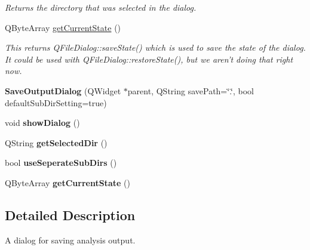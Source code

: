 \begin{DoxyCompactItemize}
\begin{DoxyCompactList}\small\item\em Returns the directory that was selected in the dialog. \end{DoxyCompactList}\item 
\hypertarget{class_save_output_dialog_a8ffa63356170be233940b800b3be8074}{Q\-Byte\-Array \hyperlink{class_save_output_dialog_a8ffa63356170be233940b800b3be8074}{get\-Current\-State} ()}\label{class_save_output_dialog_a8ffa63356170be233940b800b3be8074}

\begin{DoxyCompactList}\small\item\em This returns Q\-File\-Dialog\-::save\-State() which is used to save the state of the dialog. It could be used with Q\-File\-Dialog\-::restore\-State(), but we aren't doing that right now. \end{DoxyCompactList}\item 
\hypertarget{class_save_output_dialog_afea7bb5cab6b702a34753c498806854e}{{\bfseries Save\-Output\-Dialog} (Q\-Widget $\ast$parent, Q\-String save\-Path=\char`\"{}.\char`\"{}, bool default\-Sub\-Dir\-Setting=true)}\label{class_save_output_dialog_afea7bb5cab6b702a34753c498806854e}

\item 
\hypertarget{class_save_output_dialog_a4040f42ae9a12d196e689d1bc6d9eb2e}{void {\bfseries show\-Dialog} ()}\label{class_save_output_dialog_a4040f42ae9a12d196e689d1bc6d9eb2e}

\item 
\hypertarget{class_save_output_dialog_a3f7bba3a4efe68a2f38e444d68682144}{Q\-String {\bfseries get\-Selected\-Dir} ()}\label{class_save_output_dialog_a3f7bba3a4efe68a2f38e444d68682144}

\item 
\hypertarget{class_save_output_dialog_a542d237dada5dafeb6e6493a38941292}{bool {\bfseries use\-Seperate\-Sub\-Dirs} ()}\label{class_save_output_dialog_a542d237dada5dafeb6e6493a38941292}

\item 
\hypertarget{class_save_output_dialog_a8ffa63356170be233940b800b3be8074}{Q\-Byte\-Array {\bfseries get\-Current\-State} ()}\label{class_save_output_dialog_a8ffa63356170be233940b800b3be8074}

\end{DoxyCompactItemize}


\subsection{Detailed Description}
A dialog for saving analysis output. 

